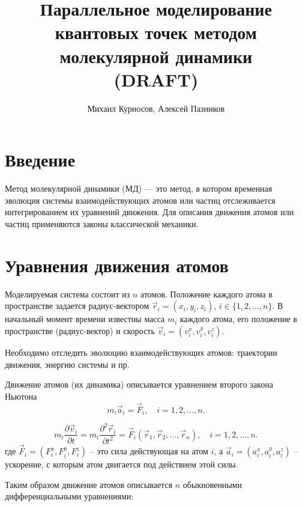 \documentclass[a4paper, 12pt]{article}
\title{Параллельное моделирование квантовых точек методом молекулярной динамики\\ (DRAFT)}
\author{Михаил Курносов, Алексей Пазников}
\begin{document}
\renewcommand{\bibname}{Список литературы}

\maketitle


\section{Введение}

Метод молекулярной динамики (МД) — это метод, в котором временная эволюция системы взаимодействующих атомов или частиц отслеживается
интегрированием их уравнений движения. Для описания движения атомов или частиц применяются законы классической механики.

\section{Уравнения движения атомов}
Моделируемая система состоит из $n$ атомов. Положение каждого атома в пространстве задается радиус-вектором $\vec{r}_i = (x_i, y_i, z_i)$, $i \in \{1, 2, \ldots, n\}$. 
В начальный момент времени известны масса $m_i$ каждого атома, его положение в пространстве (радиус-вектор) и скорость $\vec{v}_i = (v^x_i, v^y_i, v^z_i)$.

Необходимо отследить эволюцию взаимодействующих атомов: траектории движения, энергию системы и пр.

Движение атомов (их динамика) описывается уравнением второго закона Ньютона
\begin{equation}\label{eq:newtoneq}
m_i \vec{a}_i = \vec{F}_i, \quad i = 1, 2, \ldots, n.
\end{equation}

\begin{equation}
m_i \frac{\partial \vec{v}_i}{\partial t} = m_i \frac{\partial^2 \vec{r}_i}{\partial t^2} = \vec{F}_i(\vec{r}_1, \vec{r}_2, \ldots, \vec{r}_n),  \quad i = 1, 2, \ldots, n.
\end{equation}
где $\vec{F}_i = (F^x_i, F^y_i, F^z_i)$ -- это сила действующая на атом $i$, а $\vec{a}_i = (a^x_i, a^y_i, a^z_i)$ -- ускорение, с которым атом двигается под действием этой силы.

Таким образом движение атомов описывается $n$ обыкновенными дифференциальными уравнениями:
\end{document}
